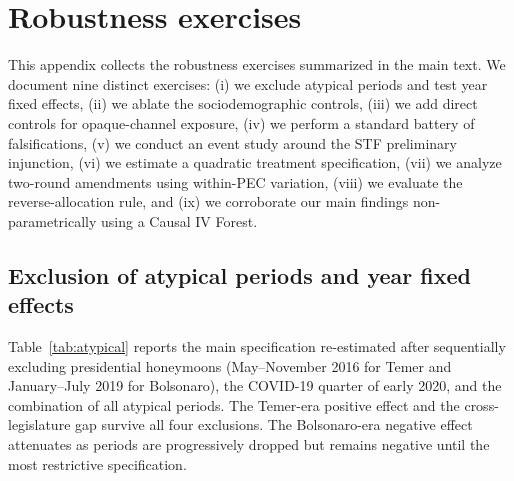 \documentclass[pdflatex,sn-basic]{sn-jnl}
\begin{document}
\section{Robustness exercises}
\label{app:robustness}

This appendix collects the robustness exercises summarized in the main text. We document nine distinct exercises: (i) we exclude atypical periods and test year fixed effects, (ii) we ablate the sociodemographic controls, (iii) we add direct controls for opaque-channel exposure, (iv) we perform a standard battery of falsifications, (v) we conduct an event study around the STF preliminary injunction, (vi) we estimate a quadratic treatment specification, (vii) we analyze two-round amendments using within-PEC variation, (viii) we evaluate the reverse-allocation rule, and (ix) we corroborate our main findings non-parametrically using a Causal IV Forest.


\subsection{Exclusion of atypical periods and year fixed effects}
\label{appsub:atypical}

Table~\ref{tab:atypical} reports the main specification re-estimated after sequentially excluding presidential honeymoons (May--November 2016 for Temer and January--July 2019 for Bolsonaro), the COVID-19 quarter of early 2020, and the combination of all atypical periods. The Temer-era positive effect and the cross-legislature gap survive all four exclusions. The Bolsonaro-era negative effect attenuates as periods are progressively dropped but remains negative until the most restrictive specification.
\end{document}
